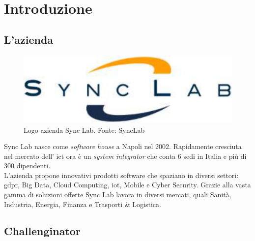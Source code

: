 \chapter{Introduzione}\label{introduzione}

\section{L'azienda}\label{azienda}

\begin{figure}[H]
    \centering
    \includegraphics{images/logo-synclab.pdf}
    \caption{Logo azienda Sync Lab. Fonte: SyncLab}
\end{figure}

Sync Lab \cite{synclab} nasce come \textit{software house} a Napoli nel 2002. Rapidamente cresciuta nel mercato dell' \acrshort{ict} ora è un \textit{system integrator} che conta 6 sedi in Italia e più di 300 dipendenti. 
\\
L'azienda propone innovativi prodotti software che spaziano in diversi settori: \acrshort{gdpr}, Big Data, Cloud Computing, \acrshort{iot}, Mobile e Cyber Security. Grazie alla vasta gamma di soluzioni offerte Sync Lab lavora in diversi mercati, quali Sanità, Industria, Energia, Finanza e Trasporti \& Logistica.

\section{Challenginator}\label{intro_challenginator}

